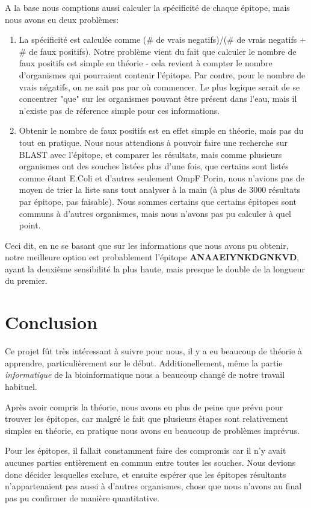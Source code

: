 \documentclass{article}
\begin{document}
    A la base nous comptions aussi calculer la spécificité de chaque épitope, mais nous avons eu deux problèmes:

    \begin{enumerate}
      \item La spécificité est calculée comme (\# de vrais negatifs)/(\# de vrais negatifs + \# de faux positifs). Notre problème vient du fait que calculer le nombre de faux positifs est simple en théorie - cela revient à compter le nombre d'organismes qui pourraient contenir l'épitope. Par contre, pour le nombre de vrais négatifs, on ne sait pas par où commencer. Le plus logique serait de se concentrer "que" sur les organismes pouvant être présent dans l'eau, mais il n'existe pas de réference simple pour ces informations.
      \item Obtenir le nombre de faux positifs est en effet simple en théorie, mais pas du tout en pratique. Nous nous attendions à pouvoir faire une recherche sur BLAST avec l'épitope, et comparer les résultats, mais comme plusieurs organismes ont des souches listées plus d'une fois, que certains sont listés comme étant E.Coli et d'autres seulement OmpF Porin, nous n'avions pas de moyen de trier la liste sans tout analyser à la main (à plus de 3000 résultats par épitope, pas faisable). Nous sommes certains que certains épitopes sont communs à d'autres organismes, mais nous n'avons pas pu calculer à quel point.
    \end{enumerate}

    Ceci dit, en ne se basant que sur les informations que nous avons pu obtenir, notre meilleure option est probablement l'épitope \textbf{ANAAEIYNKDGNKVD}, ayant la deuxième sensibilité la plus haute, mais presque le double de la longueur du premier.

  \section{Conclusion}
    Ce projet fût très intéressant à suivre pour nous, il y a eu beaucoup de théorie à apprendre, particulièrement sur le début. Additionellement, même la partie \textit{informatique} de la bioinformatique nous a beaucoup changé de notre travail habituel.

    Après avoir compris la théorie, nous avons eu plus de peine que prévu pour trouver les épitopes, car malgré le fait que plusieurs étapes sont relativement simples en théorie, en pratique nous avons eu beaucoup de problèmes imprévus.

    Pour les épitopes, il fallait constamment faire des compromis car il n'y avait aucunes parties entièrement en commun entre toutes les souches. Nous devions donc décider lesquelles exclure, et ensuite espérer que les épitopes résultants n'appartenaient pas aussi à d'autres organismes, chose que nous n'avons au final pas pu confirmer de manière quantitative.
\end{document}
